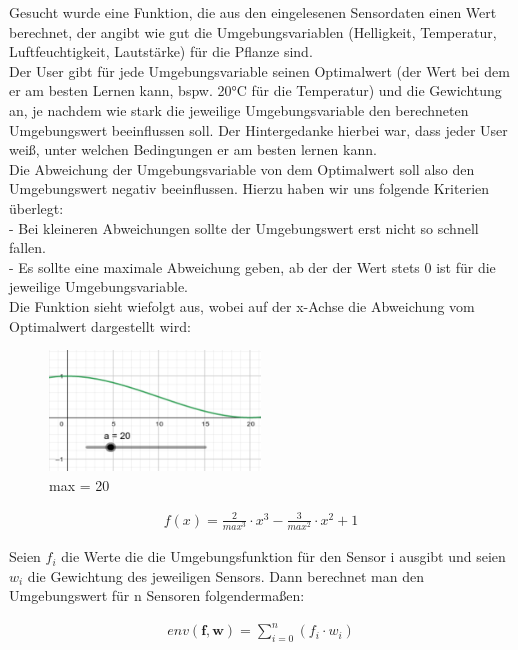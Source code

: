 \documentclass{article}
\begin{document}
Gesucht wurde eine Funktion, die aus den eingelesenen Sensordaten einen Wert berechnet, der angibt wie gut die Umgebungsvariablen (Helligkeit, Temperatur, Luftfeuchtigkeit, Lautstärke) für die Pflanze sind.\\
Der User gibt für jede Umgebungsvariable seinen Optimalwert (der Wert bei dem er am besten Lernen kann, bspw. 20°C für die Temperatur) und die Gewichtung an, je nachdem wie stark die jeweilige Umgebungsvariable den berechneten Umgebungswert beeinflussen soll. Der Hintergedanke hierbei war, dass jeder User weiß, unter welchen Bedingungen er am besten lernen kann.\\
Die Abweichung der Umgebungsvariable von dem Optimalwert soll also den Umgebungswert negativ beeinflussen. Hierzu haben wir uns folgende Kriterien überlegt:\\
- Bei kleineren Abweichungen sollte der Umgebungswert erst nicht so schnell fallen.\\
- Es sollte eine maximale Abweichung geben, ab der der Wert stets 0 ist für die jeweilige Umgebungsvariable.\\
Die Funktion sieht wiefolgt aus, wobei auf der x-Achse die Abweichung vom Optimalwert dargestellt wird:\\

\begin{figure}[h!]
\centering
\includegraphics[width=0.5\textwidth]{fnct.png}
\caption{max = 20}
\end{figure}

\begin{align*}
f(x) = 
\frac{2}{max^3} \cdot x^3 - \frac{3}{max^2}\cdot x^2 + 1
\end{align*}

Seien $f_i$ die Werte die die Umgebungsfunktion für den Sensor i ausgibt und seien $w_i$ die Gewichtung des jeweiligen Sensors. Dann berechnet man den Umgebungswert für n Sensoren folgendermaßen:

\begin{align*}
env(\boldsymbol{f},\boldsymbol{w}) = \sum_{i=0}^{n} (f_i \cdot w_i)
\end{align*}
\end{document}
